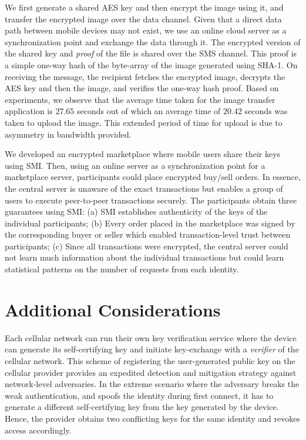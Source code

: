 \documentclass[letterpaper,twocolumn]{sig-alternate}
\begin{document}
\vspace{1mm}
 We first generate a shared AES key and then encrypt the image using it, and transfer the encrypted image over the data channel. Given that a direct data path between mobile devices may not exist, we use an online cloud server as a synchronization point and exchange the data through it. The encrypted version of the shared key and {\em proof} of the file is shared over the SMS channel. This proof is a simple one-way hash of the byte-array of the image generated using SHA-1. On receiving the message, the recipient fetches the encrypted image, decrypts the AES key and then the image, and verifies the one-way hash proof. Based on experiments, we observe that the average time taken for the image transfer application is $27.65$ seconds out of which an average time of $20.42$ seconds was taken to upload the image. This extended period of time for upload is due to asymmetry in bandwidth provided.

\vspace{1mm}
 We developed an encrypted marketplace where mobile users share their keys using SMI. Then, using an online server as a synchronization point for a marketplace server, participants could place encrypted buy/sell orders. In essence, the central server is unaware of the exact transactions but enables a group of users to execute peer-to-peer transactions securely. The participants obtain three guarantees using SMI: (a) SMI establishes authenticity of the keys of the individual participants; (b) Every order placed in the marketplace was signed by the corresponding buyer or seller which enabled transaction-level trust between participants; (c) Since all transactions were encrypted, the central server could not learn much information about the individual transactions but could learn statistical patterns on the number of requests from each identity.
 \section{Additional Considerations}
\label{extensions}

 Each cellular network can run their own key verification service where the device can generate its self-certifying key and initiate key-exchange with a {\em verifier} of the cellular network. This scheme of registering the user-generated public key on the cellular provider provides an expedited detection and mitigation strategy against network-level adversaries. In the extreme scenario where the adversary breaks the weak authentication, and spoofs the identity during first connect, it has to generate a different self-certifying key from the key generated by the device. Hence, the provider obtains two conflicting keys for the same identity and revokes access accordingly. 
\end{document}
